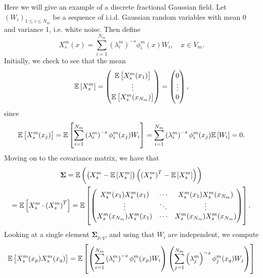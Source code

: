 \begin{example}\label{OneToSimulate}
	Here we will give an example of a discrete fractional Gaussian field. Let $(W_i)_{1\leq i \leq N_m}$ be a sequence of i.i.d. Gaussian random variables with mean 0 and variance 1, i.e. white noise. Then define
	\begin{equation}
		X_{s}^{m}(x) = \sum_{i=1}^{N_m}\left(\lambda_i^{m}\right)^{-s}\phi^{m}_{i}(x)W_i, \quad x \in V_m.
	\end{equation}
	Initially, we check to see that the mean
	\begin{equation}
		\mathbb{E} \left[X_s^{m}\right] = \begin{pmatrix}
			\mathbb{E}\left[X_s^{m}(x_1)\right] \\
			\vdots \\
			\mathbb{E} \left[X_s^{m}(x_{N_m})\right]
		\end{pmatrix} = \begin{pmatrix}
		0 \\
		\vdots \\
		0
		\end{pmatrix},
	\end{equation}
	since
	\begin{equation}
		\e \left[X_s^{m}(x_j)\right] = \e \left[\sum_{i=1}^{N_m}\left(\lambda_i^{m}\right)^{-s}\phi^{m}_{i}(x_j)W_i\right] = \sum_{i = 1}^{N_m} \left(\lambda_i^{m}\right)^{-s}\phi^{m}_{i}(x_j) \e \left[W_i\right] = 0.
	\end{equation}
	Moving on to the covariance matrix, we have that
	\begin{multline}
		\mathbf{\Sigma} = \e \left( \left(X_s^{m} - \e \left[X_s^{m}\right] \right)\left(\left(X_s^{m}\right)^{T} - \e \left[X_s^{m}\right] \right)\right) \\
		=\e \left[X_s^{m} \cdot \left(X_s^{m}\right)^{T}\right] = \e \left[\begin{pmatrix}
			X_s^{m}(x_1)X_s^{m}(x_1) & \cdots  & X_s^{m}(x_1)X_s^{m}(x_{N_m}) \\
			\vdots & \ddots  & \vdots \\
			X_s^{m}(x_{N_m})X_s^{m}(x_1)  & \cdots & X_s^{m}(x_{N_m})X_s^{m}(x_{N_m}) 
		\end{pmatrix}\right].
	\end{multline}
	Looking at a single element $\mathbf{\Sigma}_{p,q}$, and using that $W_i$ are independent, we compute
	\begin{align}
		\e \left[X_{s}^{m}(x_p)X_s^{m}(x_q)\right] &= \e \left[\left(\sum_{i=1}^{N_m}\left(\lambda_i^{m}\right)^{-s}\phi^{m}_{i}(x_p)W_i\right) \left(\sum_{j=1}^{N_m}\left(\lambda_j^{m}\right)^{-s}\phi^{m}_{j}(x_q)W_j\right)\right]\\ 

\end{align}
\end{example}
